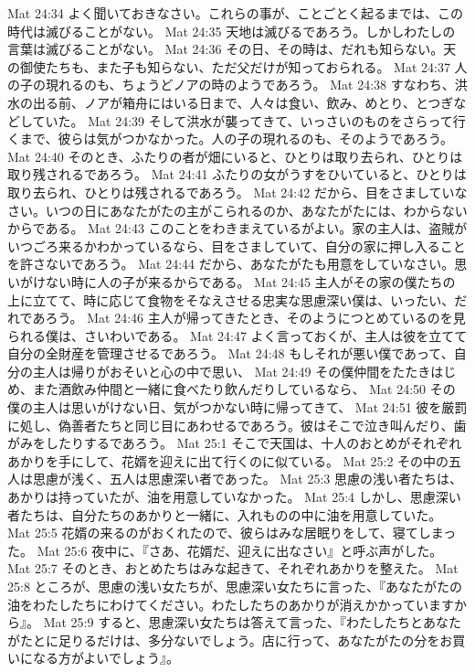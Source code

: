 Mat 24:34  よく聞いておきなさい。これらの事が、ことごとく起るまでは、この時代は滅びることがない。
Mat 24:35  天地は滅びるであろう。しかしわたしの言葉は滅びることがない。
Mat 24:36  その日、その時は、だれも知らない。天の御使たちも、また子も知らない、ただ父だけが知っておられる。
Mat 24:37  人の子の現れるのも、ちょうどノアの時のようであろう。
Mat 24:38  すなわち、洪水の出る前、ノアが箱舟にはいる日まで、人々は食い、飲み、めとり、とつぎなどしていた。
Mat 24:39  そして洪水が襲ってきて、いっさいのものをさらって行くまで、彼らは気がつかなかった。人の子の現れるのも、そのようであろう。
Mat 24:40  そのとき、ふたりの者が畑にいると、ひとりは取り去られ、ひとりは取り残されるであろう。
Mat 24:41  ふたりの女がうすをひいていると、ひとりは取り去られ、ひとりは残されるであろう。
Mat 24:42  だから、目をさましていなさい。いつの日にあなたがたの主がこられるのか、あなたがたには、わからないからである。
Mat 24:43  このことをわきまえているがよい。家の主人は、盗賊がいつごろ来るかわかっているなら、目をさましていて、自分の家に押し入ることを許さないであろう。
Mat 24:44  だから、あなたがたも用意をしていなさい。思いがけない時に人の子が来るからである。
Mat 24:45  主人がその家の僕たちの上に立てて、時に応じて食物をそなえさせる忠実な思慮深い僕は、いったい、だれであろう。
Mat 24:46  主人が帰ってきたとき、そのようにつとめているのを見られる僕は、さいわいである。
Mat 24:47  よく言っておくが、主人は彼を立てて自分の全財産を管理させるであろう。
Mat 24:48  もしそれが悪い僕であって、自分の主人は帰りがおそいと心の中で思い、
Mat 24:49  その僕仲間をたたきはじめ、また酒飲み仲間と一緒に食べたり飲んだりしているなら、
Mat 24:50  その僕の主人は思いがけない日、気がつかない時に帰ってきて、
Mat 24:51  彼を厳罰に処し、偽善者たちと同じ目にあわせるであろう。彼はそこで泣き叫んだり、歯がみをしたりするであろう。
Mat 25:1  そこで天国は、十人のおとめがそれぞれあかりを手にして、花婿を迎えに出て行くのに似ている。
Mat 25:2  その中の五人は思慮が浅く、五人は思慮深い者であった。
Mat 25:3  思慮の浅い者たちは、あかりは持っていたが、油を用意していなかった。
Mat 25:4  しかし、思慮深い者たちは、自分たちのあかりと一緒に、入れものの中に油を用意していた。
Mat 25:5  花婿の来るのがおくれたので、彼らはみな居眠りをして、寝てしまった。
Mat 25:6  夜中に、『さあ、花婿だ、迎えに出なさい』と呼ぶ声がした。
Mat 25:7  そのとき、おとめたちはみな起きて、それぞれあかりを整えた。
Mat 25:8  ところが、思慮の浅い女たちが、思慮深い女たちに言った、『あなたがたの油をわたしたちにわけてください。わたしたちのあかりが消えかかっていますから』。
Mat 25:9  すると、思慮深い女たちは答えて言った、『わたしたちとあなたがたとに足りるだけは、多分ないでしょう。店に行って、あなたがたの分をお買いになる方がよいでしょう』。
